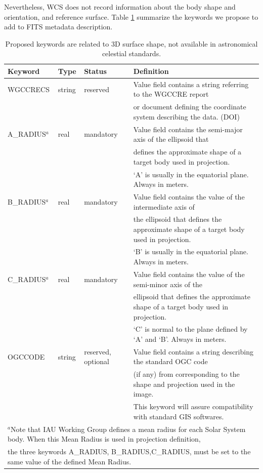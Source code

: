Nevertheless, WCS does not record information about the body shape and
orientation, and reference surface.
Table \ref{table:newkeys} summarize the keywords we propose to add to FITS metadata description.

\begin{table}
\caption{Proposed keywords are related to 3D surface shape,
not available in astronomical celestial standards.}
\centering
\begin{tabular}{l l l l}
\hline
Keyword & Type & Status & Definition  \\
\hline
WGCCRECS & string & reserved & Value field contains a string referring to the WGCCRE report \\
& & & or document defining the coordinate system describing the data. (DOI)    \\
A\_RADIUS$^{a}$ & real & mandatory & Value field contains the semi-major axis of the ellipsoid that \\
& & & defines the approximate shape of a target body used in projection. \\
& & & `A' is usually in the equatorial plane. Always in meters.  \\
B\_RADIUS$^{a}$ & real & mandatory & Value field contains the value of the intermediate axis of \\
& & & the ellipsoid that defines the approximate shape of a target body used in projection. \\
& & & `B' is usually in the equatorial plane. Always in meters.   \\
C\_RADIUS$^{a}$ & real & mandatory & Value field contains the value of the semi-minor axis of the \\
& & & ellipsoid that defines the approximate shape of a target body used in projection. \\
& & & `C' is normal to the plane defined by `A' and `B'. Always in meters. \\
OGCCODE	& string & reserved, optional & Value field contains a string describing the standard OGC code \\
& & & (if any) from \citet{hare2006} corresponding to the shape and projection used in the image. \\
& & & This keyword will assure compatibility with standard GIS softwares. \\
\hline
\multicolumn{4}{l}{$^{a}$Note that IAU Working Group defines a mean radius for each Solar System body. When this Mean Radius is used in projection definition,} \\
\multicolumn{4}{l}{  the three keywords A\_RADIUS, B\_RADIUS,C\_RADIUS, must be set to the same value of the defined Mean Radius.} \\
\end{tabular}
\label{table:newkeys}
\end{table}

